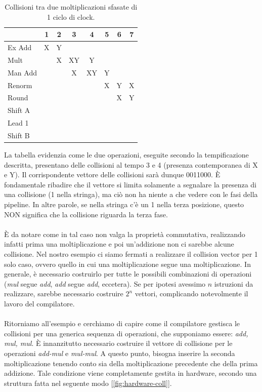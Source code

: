 \begin{table}[ht]
\centering
\begin{tabular}{|l|c|c|c|c|c|c|c|}
\hline
         & 1 & 2 & 3 & 4 & 5 & 6 & 7 \\
\hline
Ex Add   & X & Y &   &   &   &   &   \\
\hline
Mult     &   & X & XY & Y &   &   &   \\
\hline
Man Add  &   &   & X & XY & Y &   &   \\
\hline
Renorm   &   &   &   &   & X & Y & X \\
\hline
Round    &   &   &   &   &   & X & Y \\
\hline
Shift A  &   &   &   &   &   &   &   \\
\hline
Lead 1   &   &   &   &   &   &   &   \\
\hline
Shift B  &   &   &   &   &   &   &   \\
\hline
\end{tabular}
\caption{Collisioni tra due moltiplicazioni sfasate di 1 ciclo di clock.}
\label{tab:collision}
\end{table}
La tabella evidenzia come le due operazioni, eseguite secondo la tempificazione descritta, presentano delle collisioni al tempo 3 e 4 (presenza contemporanea di X e Y). Il corrispondente vettore delle collisioni sarà dunque 0011000. \MakeUppercase{è} fondamentale ribadire che il vettore si limita solamente a segnalare la presenza di una collisione (1 nella stringa), ma ciò non ha niente a che vedere con le fasi della pipeline. In altre parole, se nella stringa c'è un 1 nella terza posizione, questo NON significa che la collisione riguarda la terza fase.
\\
\\
\MakeUppercase{è} da notare come in tal caso non valga la proprietà commutativa, realizzando infatti prima una moltiplicazione e poi un'addizione non ci sarebbe alcune collisione. Nel nostro esempio ci siamo fermati a realizzare il collision vector per 1 solo caso, ovvero quello in cui una moltiplicazione segue una moltiplicazione. In generale, è necessario costruirlo per tutte le possibili combinazioni di operazioni (\textit{mul} segue \textit{add}, \textit{add} segue \textit{add}, eccetera). Se per ipotesi avessimo \(n\) istruzioni da realizzare, sarebbe necessario costruire \(2^n\) vettori, complicando notevolmente il lavoro del compilatore.
\\
\\
Ritorniamo all'esempio e cerchiamo di capire come il compilatore gestisca le collisioni per una generica sequenza di operazioni, che supponiamo essere: \textit{add, mul, mul}. \MakeUppercase{è} innanzitutto necessario costruire il vettore di collisione per le operazioni \textit{add-mul} e \textit{mul-mul}. A questo punto, bisogna inserire la seconda moltiplicazione tenendo conto sia della moltiplicazione precedente che della prima addizione. Tale condizione viene completamente gestita in hardware, secondo una struttura fatta nel seguente modo [\ref{fig:hardware-coll}].
